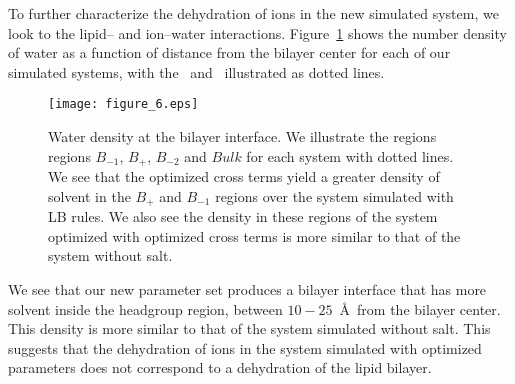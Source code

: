 To further characterize the dehydration of ions in the new simulated system, 
we look to the lipid-- and ion--water interactions.
Figure~\ref{figch2:waterdens} shows the number density of water as a
function of distance from the bilayer center for each of our simulated
systems, with the \dc~and \db~illustrated as dotted lines.  
\begin{figure}[h!tb]
    \caption[Water density at the bilayer interface]{ Water density at the bilayer interface. We illustrate the regions regions $B_{-1}$, $B_+$, $B_{-2}$ and $Bulk$ for each system with dotted lines.
    We see that the optimized cross terms yield a greater density 
    of solvent in the $B_{+}$ and $B_{-1}$ regions over the system simulated with LB rules. 
We also see the density in these regions of the system optimized
with optimized cross terms is more similar to that of the system without salt.}
    \label{figch2:waterdens}
    \texttt{[image: figure\_6.eps]}
\end{figure}
We see that our new parameter set produces a bilayer
interface that has more solvent inside the headgroup region, 
between $10-25$~\AA~from the bilayer center. 
This density is more similar to that of the system simulated without salt. 
This suggests that the dehydration of ions in the system simulated with optimized parameters
does not correspond to a dehydration of the lipid bilayer.

